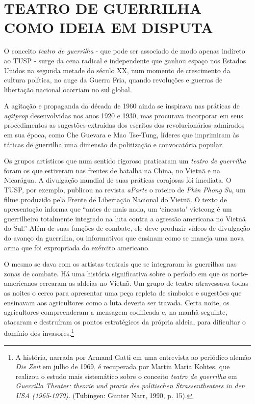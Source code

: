 \chapter{TEATRO DE GUERRILHA COMO IDEIA EM DISPUTA}

O conceito \textit{teatro de guerrilha} - que pode ser associado de modo
apenas indireto ao TUSP - surge da cena radical e independente que
ganhou espaço nos Estados Unidos na segunda metade do século XX, num
momento de crescimento da cultura política, no auge da Guerra Fria,
quando revoluções e guerras de libertação nacional ocorriam no sul
global.

A agitação e propaganda da década de 1960 ainda se inspirava nas
práticas de \textit{agitprop} desenvolvidas nos anos 1920 e 1930, mas
procurava incorporar em seus procedimentos as sugestões extraídas dos
escritos dos revolucionários admirados em sua época, como Che Guevara e
Mao Tse-Tung, líderes que imprimiram às táticas de guerrilha uma
dimensão de politização e convocatória popular.

Os grupos artísticos que num sentido rigoroso praticaram um \textit{teatro
de guerrilha} foram os que estiveram nas frentes de batalha na China, no
Vietnã e na Nicarágua. A divulgação mundial de suas práticas corajosas
foi imediata. O TUSP, por exemplo, publicou na revista \textit{aParte} o
roteiro de \textit{Phin Phong Su}, um filme produzido pela Frente de
Libertação Nacional do Vietnã. O texto de apresentação informa que
“antes de mais nada, um ‘cineasta' vietcong é um guerrilheiro totalmente
integrado na luta contra a agressão americana no Vietnã do Sul.” Além de
suas funções de combate, ele deve produzir vídeos de divulgação do
avanço da guerrilha, ou informativos que ensinam como se maneja uma nova
arma que foi expropriada do exército americano.

O mesmo se dava com os artistas teatrais que se integraram às guerrilhas
nas zonas de combate. Há uma história significativa sobre o período em
que os norte-americanos cercaram as aldeias no Vietnã. Um grupo de
teatro atravessava todas as noites o cerco para apresentar uma peça
repleta de símbolos e sugestões que ensinavam aos agricultores como a
luta deveria ser travada. Certa noite, os agricultores compreenderam a
mensagem codificada e, na manhã seguinte, atacaram e destruíram os
pontos estratégicos da própria aldeia, para dificultar o domínio dos
invasores.\footnote{A história, narrada por Armand Gatti em uma
  entrevista ao periódico alemão \textit{Die Zeit} em julho de 1969, é
  recuperada por Martin Maria Kohtes, que realizou o estudo mais
  sistemático sobre o conceito \textit{teatro de guerrilha} em
  \textit{Guerrilla Theater: theorie und praxis des politischen
  Strassentheaters in den USA (1965-1970)}. (Tübingen: Gunter Narr,
  1990, p. 15).}


